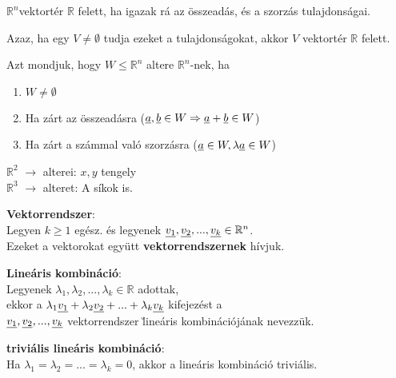 	\begin{frame}
		 \begin{tcolorbox}[title={Def.: Vektortér}]
			$\mathbb{R}^n$vektortér $\mathbb{R}$ felett, ha igazak rá az összeadás, és a szorzás tulajdonságai.\\

			\mmedskip
			
			Azaz, ha egy $V \neq \emptyset$ tudja ezeket a tulajdonságokat, akkor $V$ vektortér $\mathbb{R}$ felett.			
		\end{tcolorbox}
		
		\begin{tcolorbox}[title={Def.: Altér}]
			Azt mondjuk, hogy $W \leq \mathbb{R}^n$ altere $\mathbb{R}^n$-nek, ha
			\begin{enumerate}
				\item $W \neq \emptyset$
				\item Ha zárt az összeadásra ($\underline{a}, \underline{b} \in W \Rightarrow \underline{a} + \underline{b} \in W$)
				\item Ha zárt a számmal való szorzásra ($\underline{a} \in W, {\lambda}\underline{a} \in W$)
			\end{enumerate}
		\end{tcolorbox}
		
		\begin{tcolorbox}[title={Megj}]
			$\mathbb{R}^2$ $\rightarrow$ alterei: $x, y$ tengely\\
			$\mathbb{R}^3$ $\rightarrow$ alteret: A síkok is.
		\end{tcolorbox}
		
		\begin{tcolorbox}[title={Def.: Vektorrendszer, Lineáris kombináció}]
			\textbf{Vektorrendszer}:\\
			Legyen $k \geq 1$ egész. és legyenek $\underline{v_1}, \underline{v_2}, ..., \underline{v_k} \in \mathbb{R}^n$.\\
			Ezeket a vektorokat együtt \textbf{vektorrendszernek} hívjuk.\\			
			\msmallskip
			
			\textbf{Lineáris kombináció}:\\
			Legyenek ${\lambda}_1, {\lambda}_2, ..., {\lambda}_k \in \mathbb{R}$ adottak,\\
			ekkor a ${\lambda}_1\underline{v_1} + {\lambda}_2\underline{v_2} + ... + {\lambda}_k\underline{v_k}$ kifejezést a\\
			$\underline{v_1}, \underline{v_2}, ..., \underline{v_k}$ vektorrendszer \u{lineáris kombinációjának} nevezzük.\\
			\msmallskip			
			
			\textbf{triviális lineáris kombináció}:\\
			Ha ${\lambda}_1 = {\lambda}_2 = ... = {\lambda}_k = 0$, akkor a lineáris kombináció triviális.
		\end{tcolorbox}
	\end{frame}


